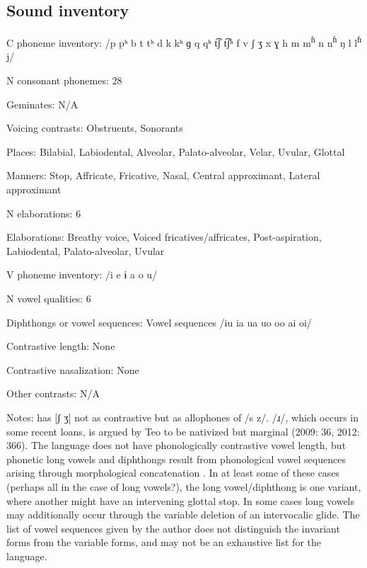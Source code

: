 {\subsection*{Sound inventory}
\begin{appendixdesc}

\item[C phoneme inventory:] /p pʰ b t tʰ d k kʰ ɡ q qʰ t͡ʃ t͡ʃʰ f v ʃ ʒ x ɣ h m m\textsuperscript{ɦ} n n\textsuperscript{ɦ} ŋ l l\textsuperscript{ɦ} j/

\item[N consonant phonemes:] 28

\item[Geminates:] N/A

\item[Voicing contrasts:] Obstruents, Sonorants

\item[Places:] Bilabial, Labiodental, Alveolar, Palato-alveolar, Velar, Uvular, Glottal

\item[Manners:] Stop, Affricate, Fricative, Nasal, Central approximant, Lateral approximant

\item[N elaborations:] 6

\item[Elaborations:] Breathy voice, Voiced fricatives/affricates, Post-aspiration, Labiodental, Palato-alveolar, Uvular

\item[V phoneme inventory:] /i e ɨ a o u/

\item[N vowel qualities:] 6

\item[Diphthongs or vowel sequences:] Vowel sequences /iu ia ua uo oo ai oi/

\item[Contrastive length:] None

\item[Contrastive nasalization:] None

\item[Other contrasts:] N/A

\item[Notes:] \citet{Sreedhar1980} has [ʃ ʒ] not as contrastive but as allophones of /s z/. /ɹ/, which occurs in some recent loans, is argued by Teo to be nativized but marginal (2009: 36, 2012: 366). The language does not have phonologically contrastive vowel length, but phonetic long vowels and diphthongs result from phonological vowel sequences arising through morphological concatenation \citep[58--59]{Teo2009}. In at least some of these cases (perhaps all in the case of long vowels?), the long vowel/diphthong is one variant, where another might have an intervening glottal stop. In some cases long vowels may additionally occur through the variable deletion of an intervocalic glide. The list of vowel sequences given by the author does not distinguish the invariant forms from the variable forms, and may not be an exhaustive list for the language.
\end{appendixdesc}
}
